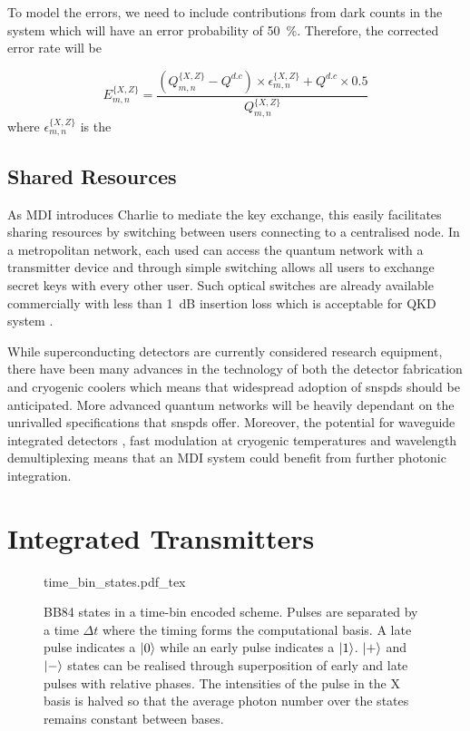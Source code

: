 To model the errors, we need to include contributions from dark counts in the system which will have an error probability of \SI{50}{\percent}. Therefore, the corrected error rate will be

\begin{equation}
	E^{\{X,Z\}}_{m,n} = \frac{\left(Q^{\{X,Z\}}_{m,n} - Q^{d.c}\right) \times \epsilon^{\{X,Z\}}_{m,n} + Q^{d.c} \times 0.5}{Q^{\{X,Z\}}_{m,n}}
\end{equation}
where $\epsilon^{\{X,Z\}}_{m,n}$ is the 

\subsection{Shared Resources}

As \ac{MDI} introduces Charlie to mediate the key exchange, this easily facilitates sharing resources by switching between users connecting to a centralised node. In a metropolitan network, each used can access the quantum network with a transmitter device and through simple switching allows all users to exchange secret keys with every other user. Such optical switches are already available commercially with less than \SI{1}{dB} insertion loss which is acceptable for \ac{QKD} system \cite{polatis}. 

While superconducting detectors are currently considered research equipment, there have been many advances in the technology of both the detector fabrication and cryogenic coolers which means that widespread adoption of \acp{snspd} should be anticipated. More advanced quantum networks will be heavily dependant on the unrivalled specifications that \acp{snspd} offer. Moreover, the potential for waveguide integrated detectors \cite{sprengers2011, vetter2016, yun2019}, fast modulation at cryogenic temperatures \cite{eltes2019} and wavelength demultiplexing \cite{sugita2000} means that an \ac{MDI} system could benefit from further photonic integration.

\section{Integrated Transmitters}

\begin{figure}[tp]
	\centering
	\small
	\def\svgwidth{0.9\textwidth} 
	{time_bin_states.pdf_tex}
	\caption[BB84 time-bin encoding]{BB84 states in a time-bin encoded scheme. Pulses are separated by a time $\Delta t$ where the timing forms the computational basis. A late pulse indicates a $\ket{0}$ while an early pulse indicates a $\ket{1}$. $\ket{+}$ and $\ket{-}$ states can be realised through superposition of early and late pulses with relative phases. The intensities of the pulse in the X basis is halved so that the average photon number over the states remains constant between bases.}
	\label{fig:BB84_time_bin}
\end{figure}

